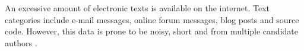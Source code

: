 An excessive amount of electronic texts is available on the internet.
Text categories include e-mail messages, online forum messages, blog posts and source code.
However, this data is prone to be noisy, short and from multiple candidate authors \cite{stamatatos_survey_2009}.
